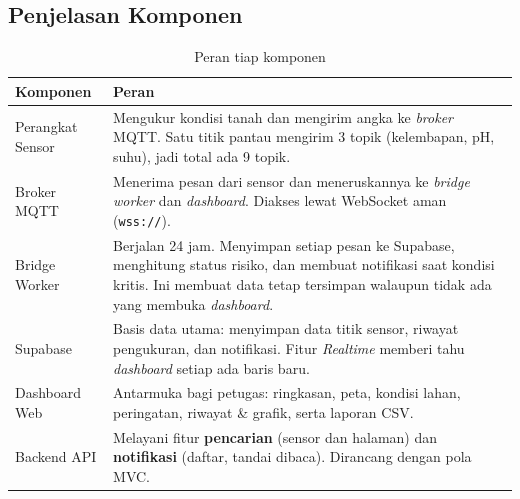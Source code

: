 \documentclass[11pt,a4paper]{article}
\newcommand{\kode}[1]{\texttt{#1}}
\begin{document}
\subsection{Penjelasan Komponen}
\begin{table}[H]
\centering
\caption{Peran tiap komponen}
\label{tab:komponen}
\begin{tabularx}{\linewidth}{@{}lL@{}}
\toprule
\textbf{Komponen} & \textbf{Peran} \\
\midrule
Perangkat Sensor & Mengukur kondisi tanah dan mengirim angka ke \textit{broker} MQTT. Satu titik pantau mengirim 3 topik (kelembapan, pH, suhu), jadi total ada 9 topik. \\
Broker MQTT & Menerima pesan dari sensor dan meneruskannya ke \textit{bridge worker} dan \textit{dashboard}. Diakses lewat WebSocket aman (\kode{wss://}). \\
Bridge Worker & Berjalan 24 jam. Menyimpan setiap pesan ke Supabase, menghitung status risiko, dan membuat notifikasi saat kondisi kritis. Ini membuat data tetap tersimpan walaupun tidak ada yang membuka \textit{dashboard}. \\
Supabase & Basis data utama: menyimpan data titik sensor, riwayat pengukuran, dan notifikasi. Fitur \textit{Realtime} memberi tahu \textit{dashboard} setiap ada baris baru. \\
Dashboard Web & Antarmuka bagi petugas: ringkasan, peta, kondisi lahan, peringatan, riwayat \& grafik, serta laporan CSV. \\
Backend API & Melayani fitur \textbf{pencarian} (sensor dan halaman) dan \textbf{notifikasi} (daftar, tandai dibaca). Dirancang dengan pola MVC. \\
\bottomrule
\end{tabularx}
\end{table}
\end{document}
